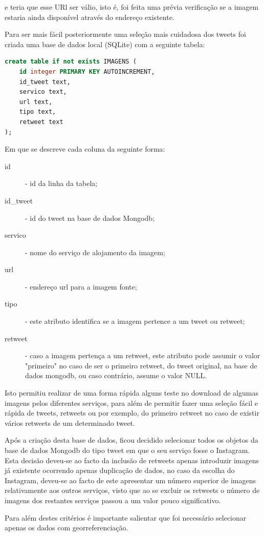 e teria que esse URl ser válio, isto é, foi feita uma prévia verificação se a imagem estaria ainda disponível através do endereço existente.

Para ser mais fácil posteriormente uma seleção mais cuidadosa dos tweets foi criada uma base de dados local (SQLite) com a seguinte tabela:

\begin{lstlisting}[language=SQL]
create table if not exists IMAGENS ( 
	id integer PRIMARY KEY AUTOINCREMENT, 
	id_tweet text, 
	servico text, 
	url text, 
	tipo text, 
	retweet text 
); 
\end{lstlisting}

Em que se descreve cada coluna da seguinte forma:

\begin{description}
\item[id] - id da linha da tabela;
\item[id\_tweet] - id do tweet na base de dados Mongodb;
\item[servico] - nome do serviço de alojamento da imagem;
\item[url] - endereço url para a imagem fonte;
\item[tipo] - este atributo identifica se a imagem pertence a um tweet ou retweet;
\item[retweet] - caso a imagem pertença a um retweet, este atributo pode assumir o valor "primeiro" no caso de ser o primeiro retweet, do tweet original, na base de dados mongodb, ou caso contrário, assume o valor NULL.
\end{description}

Isto permitiu realizar de uma forma rápida alguns teste no download de algumas imagens pelos diferentes serviços, para além de permitir fazer uma seleção fácil e rápida de tweets, retweets ou por exemplo, do primeiro retweet no caso de existir vários retweets de um determinado tweet. 

Após a criação desta base de dados, ficou decidido selecionar todos os objetos da base de dados Mongodb do tipo tweet em que o seu serviço fosse o Instagram. Esta decisão deveu-se ao facto da inclusão de retweets apenas introduzir imagens já existente ocorrendo apenas duplicação de dados, no caso da escolha do Instagram, deveu-se ao facto de este apresentar um número superior de imagens relativamente aos outros serviços, visto que ao se excluir os retweets o número de imagens dos restantes serviços passou a um valor pouco significativo.

Para além destes critérios é importante salientar que foi necessário selecionar apenas os dados com georreferenciação. 

